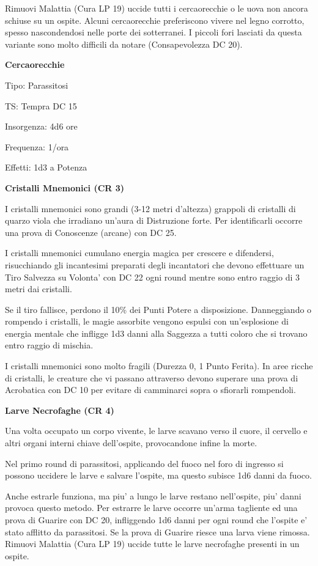 \documentclass[a4paper,11pt,twoside,openany]{book}
\begin{document}
{		Rimuovi Malattia (Cura LP 19) uccide tutti i cercaorecchie o le uova non ancora schiuse su un ospite. Alcuni cercaorecchie preferiscono vivere nel legno corrotto, spesso nascondendosi nelle porte dei sotterranei. I piccoli fori lasciati da questa variante sono molto difficili da notare (Consapevolezza DC 20).
		
		\textbf{Cercaorecchie}
		
		Tipo: Parassitosi
		
		TS: Tempra DC 15
		
		Insorgenza: 4d6 ore
		
		Frequenza: 1/ora
		
		Effetti: 1d3 a Potenza
		
		\textbf{Cristalli Mnemonici (CR 3)}
		
		I cristalli mnemonici sono grandi (3-12 metri d'altezza) grappoli di cristalli di quarzo viola che irradiano un'aura di Distruzione forte. Per identificarli occorre una prova di Conoscenze (arcane) con DC 25.
		
		I cristalli mnemonici cumulano energia magica per crescere e difendersi, risucchiando gli incantesimi preparati degli incantatori che devono effettuare un Tiro Salvezza su Volonta' con DC 22 ogni round mentre sono entro raggio di 3 metri dai cristalli.
		
		Se il tiro fallisce, perdono il 10\% dei Punti Potere a disposizione. Danneggiando o rompendo i cristalli, le magie assorbite vengono espulsi con un'esplosione di energia mentale che infligge 1d3 danni alla Saggezza a tutti coloro che si trovano entro raggio di mischia.
		
		I cristalli mnemonici sono molto fragili (Durezza 0, 1 Punto Ferita).
		In aree ricche di cristalli, le creature che vi passano attraverso devono superare una prova di Acrobatica con DC 10 per evitare di camminarci sopra o sfiorarli rompendoli.
		
		\textbf{Larve Necrofaghe (CR 4)}
		
		Una volta occupato un corpo vivente, le larve scavano verso il cuore, il cervello e altri organi interni chiave dell'ospite, provocandone infine la morte.
		
		Nel primo round di parassitosi, applicando del fuoco nel foro di ingresso si possono uccidere le larve e salvare l'ospite, ma questo subisce 1d6 danni da fuoco. 
		
		Anche estrarle funziona, ma piu' a lungo le larve restano nell'ospite, piu' danni provoca questo metodo. Per estrarre le larve occorre un'arma tagliente ed una prova di Guarire con DC 20, infliggendo 1d6 danni per ogni round che l'ospite e' stato afflitto da parassitosi. Se la prova di Guarire riesce una larva viene rimossa. Rimuovi Malattia (Cura LP 19) uccide tutte le larve necrofaghe presenti in un ospite.
		
}
\end{document}
